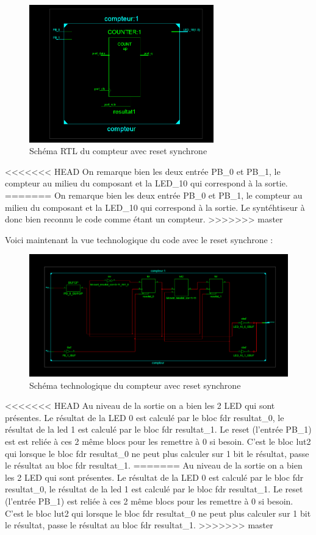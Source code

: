 \documentclass[11pt]{report}
\begin{document}
 \begin{figure}[h]
\begin{center}
\includegraphics[width=8cm]{TP02-3.PNG}
\caption{Schéma RTL du compteur avec reset synchrone}
\end{center}
\end{figure}


<<<<<<< HEAD
On remarque bien les deux entrée PB\_0 et PB\_1, le compteur au milieu du composant et la LED\_10 qui correspond à la sortie.
=======
On remarque bien les deux entrée PB\_0 et PB\_1, le compteur au milieu du composant et la LED\_10 qui correspond à la sortie. Le syntéhtiseur à donc bien reconnu le code comme étant un compteur.
>>>>>>> master

Voici maintenant la vue technologique du code avec le reset synchrone :

\begin{figure}[h!]
\begin{center}
\includegraphics[width=15cm]{TP02-4.PNG}
\caption{Schéma technologique du compteur avec reset synchrone}
\end{center}
\end{figure}

<<<<<<< HEAD
Au niveau de la sortie on a bien les 2 LED qui sont présentes. Le résultat de la LED 0 est calculé par le bloc fdr resultat\_0, le résultat de la led 1 est calculé par le bloc fdr resultat\_1.
Le reset (l'entrée PB\_1) est est reliée à ces 2 même blocs pour les remettre à 0 si besoin.
C'est le bloc lut2 qui lorsque le bloc fdr resultat\_0 ne peut plus calculer sur 1 bit le résultat, passe le résultat au bloc fdr resultat\_1.
=======
Au niveau de la sortie on a bien les 2 LED qui sont présentes. Le résultat de la LED 0 est calculé par le bloc fdr resultat\_0, le résultat de la led 1 est calculé par le bloc fdr resultat\_1. 
Le reset (l'entrée PB\_1) est reliée à ces 2 même blocs pour les remettre à 0 si besoin. 
C'est le bloc lut2 qui lorsque le bloc fdr resultat\_0 ne peut plus calculer sur 1 bit le résultat, passe le résultat au bloc fdr resultat\_1. 
>>>>>>> master
\end{document}
